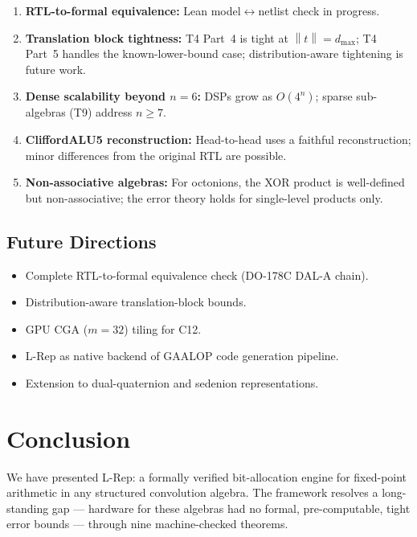 \documentclass[11pt,a4paper]{article}
\theoremstyle{definition}
\theoremstyle{plain}
\theoremstyle{remark}
\newcommand{\norm}[1]{\left\|#1\right\|}
\begin{document}
\begin{enumerate}
  \item \textbf{RTL-to-formal equivalence:}
        Lean model$\leftrightarrow$netlist check in progress.
  \item \textbf{Translation block tightness:}
        T4 Part~4 is tight at $\norm{t}=d_{\max}$; T4 Part~5 handles
        the known-lower-bound case; distribution-aware tightening
        is future work.
  \item \textbf{Dense scalability beyond $n=6$:}
        DSPs grow as $O(4^n)$; sparse sub-algebras (T9) address $n\ge7$.
  \item \textbf{CliffordALU5 reconstruction:}
        Head-to-head uses a faithful reconstruction; minor differences
        from the original RTL are possible.
  \item \textbf{Non-associative algebras:}
        For octonions, the XOR product is well-defined but non-associative;
        the error theory holds for single-level products only.
\end{enumerate}

\subsection{Future Directions}

\begin{itemize}
  \item Complete RTL-to-formal equivalence check (DO-178C DAL-A chain).
  \item Distribution-aware translation-block bounds.
  \item GPU CGA ($m=32$) tiling for C12.
  \item L-Rep as native backend of GAALOP code generation pipeline.
  \item Extension to dual-quaternion and sedenion representations.
\end{itemize}

\section{Conclusion}
\label{sec:conclusion}

We have presented L-Rep: a formally verified bit-allocation engine
for fixed-point arithmetic in any structured convolution algebra.
The framework resolves a long-standing gap --- hardware for these algebras
had no formal, pre-computable, tight error bounds --- through nine
machine-checked theorems.
\end{document}
